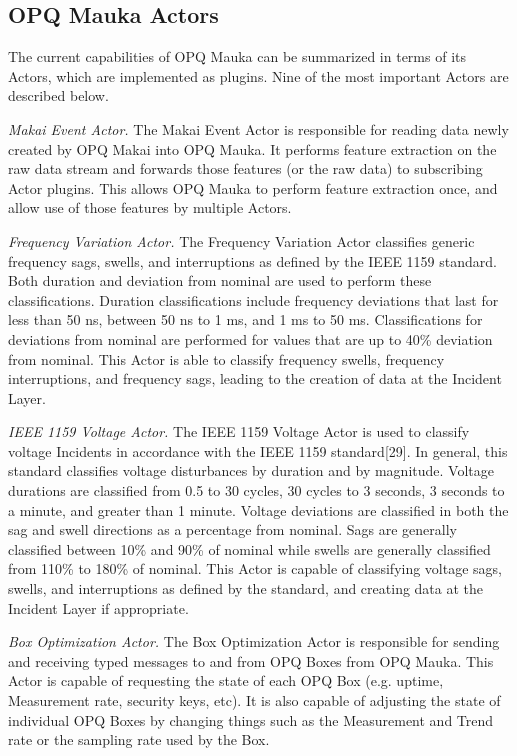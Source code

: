 \subsection{OPQ Mauka Actors}

The current capabilities of OPQ Mauka can be summarized in terms of its Actors, which are implemented as plugins. Nine of the most important Actors are described below.

{\em Makai Event Actor.} The Makai Event Actor is responsible for reading data newly created by OPQ Makai into OPQ Mauka. It performs feature extraction on the raw data stream and forwards those features (or the raw data) to subscribing Actor plugins. This allows OPQ Mauka to perform feature extraction once, and allow use of those features by multiple Actors.

{\em Frequency Variation Actor.} The Frequency Variation Actor classifies generic frequency sags, swells, and interruptions as defined by the IEEE 1159 standard. Both duration and deviation from nominal are used to perform these classifications. Duration classifications include frequency deviations that last for less than 50 ns, between 50 ns to 1 ms, and 1 ms to 50 ms. Classifications for deviations from nominal are performed for values that are up to 40\% deviation from nominal. This Actor is able to classify frequency swells, frequency interruptions, and frequency sags, leading to the creation of data at the Incident Layer.

{\em IEEE 1159 Voltage Actor.} The IEEE 1159 Voltage Actor is used to classify voltage Incidents in accordance with the IEEE 1159 standard[29]. In general, this standard classifies voltage disturbances by duration and by magnitude. Voltage durations are classified from 0.5 to 30 cycles, 30 cycles to 3 seconds, 3 seconds to a minute, and greater than 1 minute. Voltage deviations are classified in both the sag and swell directions as a percentage from nominal. Sags are generally classified between 10\% and 90\% of nominal while swells are generally classified from 110\% to 180\% of nominal. This Actor is capable of classifying voltage sags, swells, and interruptions as defined by the standard, and creating data at the Incident Layer if appropriate.

{\em Box Optimization Actor.} The Box Optimization Actor is responsible for sending and receiving typed messages to and from OPQ Boxes from OPQ Mauka. This Actor is capable of requesting the state of each OPQ Box (e.g. uptime, Measurement rate, security keys, etc). It is also capable of adjusting the state of individual OPQ Boxes by changing things such as the Measurement and Trend rate or the sampling rate used by the Box.

